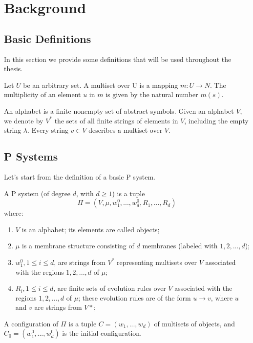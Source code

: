 \chapter{Background}

\section{Basic Definitions}

In this section we provide some definitions that will be used throughout the thesis.

\begin{definition}[Multiset]
Let $U$ be an arbitrary set. A multiset over U is a mapping \newline $m : U \rightarrow N$.
The multiplicity of an element $u$ in $m$ is given by the natural number $m(s)$.
\end{definition}

\begin{definition}[Alphabet]
An alphabet is a finite nonempty set of abstract symbols. Given an alphabet $V$, we denote by $V^*$
the sets of all finite strings of elements in $V$, including the empty string $\lambda$.
Every string $v \in V$ describes a multiset over $V$.
\end{definition}

\section{P Systems}

Let's start from the definition of a basic P system.

\begin{definition}[P system]
A P system (of degree $d$, with $d \geq 1$) is a tuple
\[ \Pi = (V,\mu,w^0_1,...,w^0_d,R_1,...,R_d)\]
where:
\begin{enumerate}
  \item $V$ is an alphabet; its elements are called objects;
  \item $\mu$ is a membrane structure consisting of $d$ membranes (labeled with $1,2,...,d$);
  \item $w^0_1, 1 \leq i \leq d$, are strings from $V^*$ representing multisets over $V$ associated
  with the regions $1,2,...,d$ of $\mu$;
  \item $R_i, 1 \leq i \leq d$, are finite sets of evolution rules over $V$ associated 
  with the regions $1,2,...,d$ of $\mu$; these evolution rules are of the form $u \rightarrow v$,
  where $u$ and $v$ are strings from $V*$;
\end{enumerate}
A configuration of $\Pi$ is a tuple $C=(w_1,...,w_d)$ of multisets of objects, and 
$C_0=(w^0_1,...,w^0_d)$ is the initial configuration.
\end{definition}

